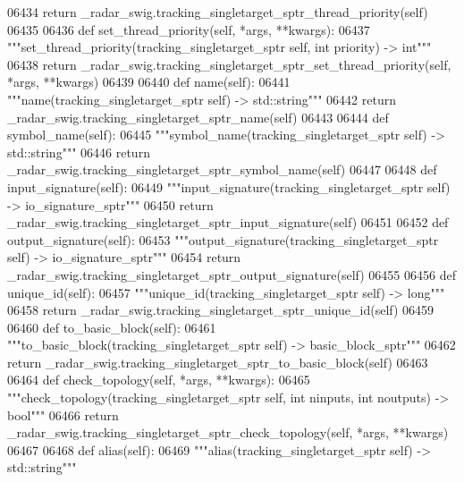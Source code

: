 \begin{DoxyCode}
{{{{{{{{{{{{{{{{{{{{{06434         \textcolor{keywordflow}{return} \_radar\_swig.tracking\_singletarget\_sptr\_thread\_priority(self)
06435 
06436     \textcolor{keyword}{def }set_thread_priority(self, *args, **kwargs):
06437         \textcolor{stringliteral}{"""set\_thread\_priority(tracking\_singletarget\_sptr self, int priority) -> int"""}
06438         \textcolor{keywordflow}{return} \_radar\_swig.tracking\_singletarget\_sptr\_set\_thread\_priority(self, *args, **kwargs)
06439 
06440     \textcolor{keyword}{def }name(self):
06441         \textcolor{stringliteral}{"""name(tracking\_singletarget\_sptr self) -> std::string"""}
06442         \textcolor{keywordflow}{return} \_radar\_swig.tracking\_singletarget\_sptr\_name(self)
06443 
06444     \textcolor{keyword}{def }symbol_name(self):
06445         \textcolor{stringliteral}{"""symbol\_name(tracking\_singletarget\_sptr self) -> std::string"""}
06446         \textcolor{keywordflow}{return} \_radar\_swig.tracking\_singletarget\_sptr\_symbol\_name(self)
06447 
06448     \textcolor{keyword}{def }input_signature(self):
06449         \textcolor{stringliteral}{"""input\_signature(tracking\_singletarget\_sptr self) -> io\_signature\_sptr"""}
06450         \textcolor{keywordflow}{return} \_radar\_swig.tracking\_singletarget\_sptr\_input\_signature(self)
06451 
06452     \textcolor{keyword}{def }output_signature(self):
06453         \textcolor{stringliteral}{"""output\_signature(tracking\_singletarget\_sptr self) -> io\_signature\_sptr"""}
06454         \textcolor{keywordflow}{return} \_radar\_swig.tracking\_singletarget\_sptr\_output\_signature(self)
06455 
06456     \textcolor{keyword}{def }unique_id(self):
06457         \textcolor{stringliteral}{"""unique\_id(tracking\_singletarget\_sptr self) -> long"""}
06458         \textcolor{keywordflow}{return} \_radar\_swig.tracking\_singletarget\_sptr\_unique\_id(self)
06459 
06460     \textcolor{keyword}{def }to_basic_block(self):
06461         \textcolor{stringliteral}{"""to\_basic\_block(tracking\_singletarget\_sptr self) -> basic\_block\_sptr"""}
06462         \textcolor{keywordflow}{return} \_radar\_swig.tracking\_singletarget\_sptr\_to\_basic\_block(self)
06463 
06464     \textcolor{keyword}{def }check_topology(self, *args, **kwargs):
06465         \textcolor{stringliteral}{"""check\_topology(tracking\_singletarget\_sptr self, int ninputs, int noutputs) -> bool"""}
06466         \textcolor{keywordflow}{return} \_radar\_swig.tracking\_singletarget\_sptr\_check\_topology(self, *args, **kwargs)
06467 
06468     \textcolor{keyword}{def }alias(self):
06469         \textcolor{stringliteral}{"""alias(tracking\_singletarget\_sptr self) -> std::string"""}
}}}}}}}}}}}}}}}}}}}}}
\end{DoxyCode}
